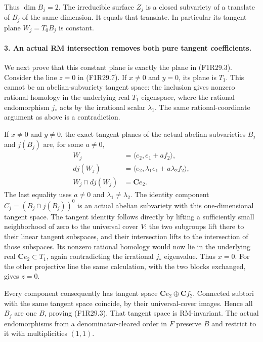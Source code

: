 Thus $\dim B_j=2$. The irreducible surface
$Z_j$ is a closed subvariety of a translate
of $B_j$ of the same dimension. It equals
that translate. In particular its tangent
plane $W_j=T_0B_j$ is constant.

\paragraph{3. An actual RM intersection removes both pure tangent coefficients.}
We next prove that this constant plane is
exactly the plane in (F1R29.3).
Consider the line $z=0$ in (F1R29.7).
If $x\ne0$ and $y=0$, its plane is $T_1$.
This cannot be an abelian-subvariety tangent
space: the inclusion gives nonzero rational
homology in the underlying real $T_1$
eigenspace, where the rational endomorphism
$j_*$ acts by the irrational scalar
$\lambda_1$. The same rational-coordinate
argument as above is a contradiction.

If $x\ne0$ and $y\ne0$, the exact tangent
planes of the actual abelian subvarieties
$B_j$ and $j(B_j)$ are, for some $a\ne0$,
\[
 \begin{split}
 W_j&=\langle e_2,e_1+a f_2\rangle,\\
 dj(W_j)&=\langle e_2,
                      \lambda_1e_1+a\lambda_2 f_2\rangle,\\
 W_j\cap dj(W_j)&=\mathbf C e_2.
 \end{split}
 \tag{F1R29.11}
\]
The last equality uses $a\ne0$ and
$\lambda_1\ne\lambda_2$.
The identity component
$C_j=(B_j\cap j(B_j))^0$ is an actual abelian
subvariety with this one-dimensional tangent
space. The tangent identity follows directly
by lifting a sufficiently small neighborhood
of zero to the universal cover $V$: the two
subgroups lift there to their linear tangent
subspaces, and their intersection lifts to
the intersection of those subspaces.
Its nonzero rational homology would now lie
in the underlying real $\mathbf C e_2\subset
T_1$, again contradicting the irrational
$j_*$ eigenvalue. Thus $x=0$.
For the other projective line the same
calculation, with the two blocks exchanged,
gives $z=0$.

Every component consequently has tangent
space $\mathbf C e_2\oplus\mathbf C f_2$.
Connected subtori with the same tangent
space coincide, by their universal-cover
images. Hence all $B_j$ are one $B$,
proving (F1R29.3). That tangent space is
RM-invariant. The actual endomorphisms
from a denominator-cleared order in $F$
preserve $B$ and restrict to it with
multiplicities $(1,1)$.

